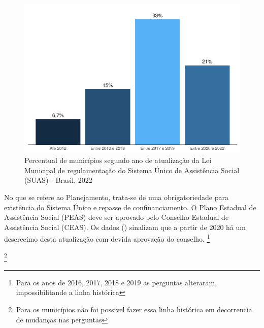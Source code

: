 \documentclass[
  brazilian]{report}
\begin{document}
\begin{figure}
\includegraphics{Censo-SUAS-2022_files/figure-latex/municipios-atualizacao-lei-1} \caption[Percentual de municípios segundo ano de atualização da Lei Municipal de regulamentação do Sistema Único de Assistência Social (SUAS) - Brasil, 2022]{Percentual de municípios segundo ano de atualização da Lei Municipal de regulamentação do Sistema Único de Assistência Social (SUAS) - Brasil, 2022}\label{fig:municipios-atualizacao-lei}
\end{figure}

No que se refere ao Planejamento, trata-se de uma obrigatoriedade para
existência do Sistema Único e repasse de confinanciamento. O Plano
Estadual de Assistência Social (PEAS) deve ser aprovado pelo Conselho
Estadual de Assistência Social (CEAS). Os dados ()
sinalizam que a partir de 2020 há um descrecimo desta atualização com
devida aprovação do conselho.
\footnote{Para os anos de 2016, 2017, 2018 e 2019 as perguntas alteraram, impossibilitande a linha histórica}

\footnote{Para os municípios não foi possivel fazer essa linha histórica em decorrencia de mudanças nas perguntas}
\end{document}

